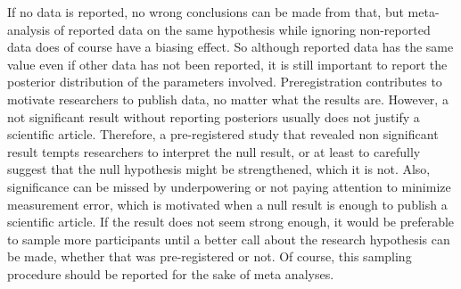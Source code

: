 \documentclass[man]{apa7}\usepackage[]{graphicx}\usepackage[]{xcolor}
\theoremstyle{definition}
\begin{document}
If no data is reported, no wrong conclusions can be made from that, but meta-analysis of reported data on the same hypothesis while ignoring non-reported data does of course have a biasing effect. So although reported data has the same value even if other data has not been reported, it is still important to report the posterior distribution of the parameters involved. Preregistration contributes to motivate researchers to publish data, no matter what the results are. However, a not significant result without reporting posteriors usually does not justify a scientific article. Therefore, a pre-registered study that revealed non significant result tempts researchers to interpret the null result, or at least to carefully suggest that the null hypothesis might be strengthened, which it is not. Also, significance can be missed by underpowering or not paying attention to minimize measurement error, which is motivated when a null result is enough to publish a scientific article. If the result does not seem strong enough, it would be preferable to sample more participants until a better call about the research hypothesis can be made, whether that was pre-registered or not. Of course, this sampling procedure should be reported for the sake of meta analyses.
\end{document}
